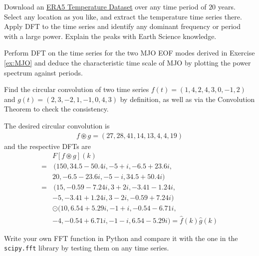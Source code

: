 \begin{Exercise}
Download an \href{https://cds.climate.copernicus.eu/datasets/reanalysis-era5-single-levels?tab=download}{ERA5 Temperature Dataset} over any time period of $20$ years. Select any location as you like, and extract the temperature time series there. Apply DFT to the time series and identify any dominant frequency or period with a large power. Explain the peaks with Earth Science knowledge.
\end{Exercise}

\begin{Exercise}
Perform DFT on the time series for the two MJO EOF modes derived in Exercise \ref{ex:MJO} and deduce the characteristic time scale of MJO by plotting the power spectrum against periods.
\end{Exercise}

\begin{Exercise}
Find the circular convolution of two time series $f(t) = (1,4,2,4, \allowbreak 3,0,-1,2)$ and $g(t) = (2,3,-2,1,-1,0,4,3)$ by definition, as well as via the Convolution Theorem to check the consistency.
\end{Exercise}
\begin{Answer}
The desired circular convolution is
\begin{align*}
f \circledast g = (27, 28, 41, 14, 13, 4, 4, 19)
\end{align*}
and the respective DFTs are
\begin{align*}
& F[f \circledast g](k) \\
=&\, (150, 34.5-50.4i, -5+i, -6.5+23.6i, \\
& 20, -6.5-23.6i, -5-i, 34.5+50.4i) \\
=&\, (15, -0.59-7.24i, 3+2i, -3.41-1.24i, \\
& {-5}, -3.41+1.24i, 3-2i, -0.59+7.24i) \\
& \odot (10, 6.54+5.29i, -1+i, -0.54-6.71i, \\
& {-4}, -0.54+6.71i, -1-i, 6.54-5.29i) = \hat{f}(k)\hat{g}(k)
\end{align*}
\end{Answer}

\begin{Exercise}
Write your own FFT function in Python and compare it with the one in the \verb|scipy.fft| library by testing them on any time series.
\end{Exercise}